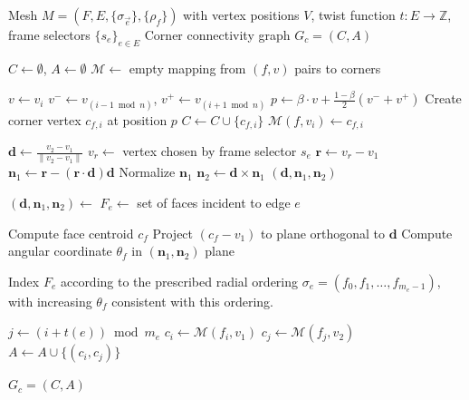 \documentclass[acmtog]{acmart}
\begin{document}
\begin{algorithm}[htb!]
\caption{Twisted Corner Connectivity Graph Construction}
\label{alg:corner_graph}
\begin{algorithmic}[1]
\Require Mesh $M = (F, E, \{\sigma_{\vec{e}}\}, \{\rho_f\})$ with vertex positions $V$, twist function $t : E \to \mathbb{Z}$, frame selectors $\{s_e\}_{e \in E}$
\Ensure Corner connectivity graph $G_c = (C, A)$

\State $C \gets \emptyset$, $A \gets \emptyset$
\State $\mathcal{M} \gets$ empty mapping from $(f, v)$ pairs to corners

            \State $v \gets v_i$
            \State $v^- \gets v_{(i-1 \bmod n)}$, $v^+ \gets v_{(i+1 \bmod n)}$
            \State $p \gets \beta \cdot v + \frac{1-\beta}{2}(v^- + v^+)$ 
            \State Create corner vertex $c_{f,i}$ at position $p$
            \State $C \gets C \cup \{c_{f,i}\}$
            \State $\mathcal{M}(f, v_i) \gets c_{f,i}$
        \EndFor
    \EndFor
\EndFunction

    \State $\mathbf{d} \gets \frac{v_2 - v_1}{\|v_2 - v_1\|}$ 
    \State $v_r \gets$ vertex chosen by frame selector $s_e$
    \State $\mathbf{r} \gets v_r - v_1$
    \State $\mathbf{n}_1 \gets \mathbf{r} - (\mathbf{r} \cdot \mathbf{d})\mathbf{d}$ 
    \State Normalize $\mathbf{n}_1$
    \State $\mathbf{n}_2 \gets \mathbf{d} \times \mathbf{n}_1$ 
    \State \Return $(\mathbf{d}, \mathbf{n}_1, \mathbf{n}_2)$
\EndFunction

    \State $(\mathbf{d}, \mathbf{n}_1, \mathbf{n}_2) \gets$ 
    \State $F_e \gets$ set of faces incident to edge $e$
    
        \State Compute face centroid $c_f$
        \State Project $(c_f - v_1)$ to plane orthogonal to $\mathbf{d}$
        \State Compute angular coordinate $\theta_f$ in $(\mathbf{n}_1, \mathbf{n}_2)$ plane
    \EndFor
    
    \State Index $F_e$ according to the prescribed radial ordering
$\sigma_e=(f_0,f_1,\ldots,f_{m_e-1})$, with increasing $\theta_f$
consistent with this ordering.
    
        \State $j \gets (i + t(e)) \bmod m_e$ 
        \State $c_i \gets \mathcal{M}(f_i, v_1)$ 
        \State $c_j \gets \mathcal{M}(f_j, v_2)$ 
        \State $A \gets A \cup \{(c_i, c_j)\}$ 
    \EndFor
\EndFunction

\State {}
    \State {}
\EndFor

\State \Return $G_c = (C, A)$
\end{algorithmic}
\end{algorithm}
\end{document}
